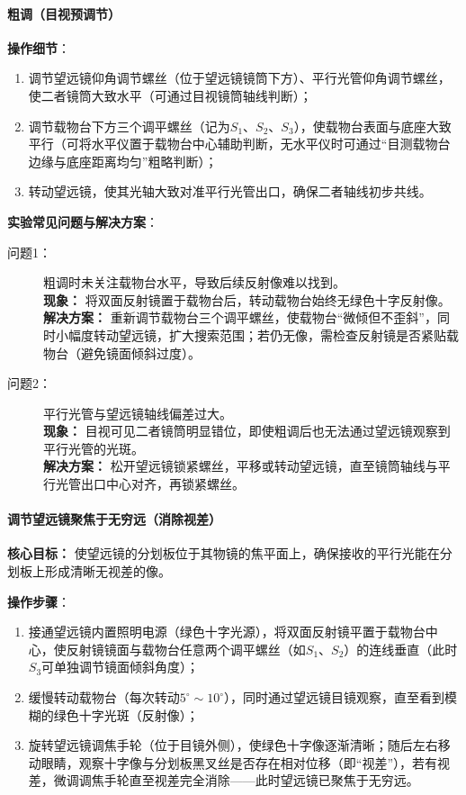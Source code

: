 \documentclass[11pt]{article}
\begin{document}
\paragraph{粗调（目视预调节）}
\textbf{操作细节}：
\begin{enumerate}[label=(\arabic*), itemsep=0.5ex]
    \item 调节望远镜仰角调节螺丝（位于望远镜镜筒下方）、平行光管仰角调节螺丝，使二者镜筒大致水平（可通过目视镜筒轴线判断）；
    \item 调节载物台下方三个调平螺丝（记为$S_1$、$S_2$、$S_3$），使载物台表面与底座大致平行（可将水平仪置于载物台中心辅助判断，无水平仪时可通过“目测载物台边缘与底座距离均匀”粗略判断）；
    \item 转动望远镜，使其光轴大致对准平行光管出口，确保二者轴线初步共线。
\end{enumerate}

\textbf{实验常见问题与解决方案}：
\begin{description}
    \item[问题1：] 粗调时未关注载物台水平，导致后续反射像难以找到。\\
    \textbf{现象：} 将双面反射镜置于载物台后，转动载物台始终无绿色十字反射像。\\
    \textbf{解决方案：} 重新调节载物台三个调平螺丝，使载物台“微倾但不歪斜”，同时小幅度转动望远镜，扩大搜索范围；若仍无像，需检查反射镜是否紧贴载物台（避免镜面倾斜过度）。
    
    \item[问题2：] 平行光管与望远镜轴线偏差过大。\\
    \textbf{现象：} 目视可见二者镜筒明显错位，即使粗调后也无法通过望远镜观察到平行光管的光斑。\\
    \textbf{解决方案：} 松开望远镜锁紧螺丝，平移或转动望远镜，直至镜筒轴线与平行光管出口中心对齐，再锁紧螺丝。
\end{description}

\paragraph{调节望远镜聚焦于无穷远（消除视差）}
\textbf{核心目标：} 使望远镜的分划板位于其物镜的焦平面上，确保接收的平行光能在分划板上形成清晰无视差的像。

\textbf{操作步骤}：
\begin{enumerate}[label=(\arabic*), itemsep=0.5ex]
    \item 接通望远镜内置照明电源（绿色十字光源），将双面反射镜平置于载物台中心，使反射镜镜面与载物台任意两个调平螺丝（如$S_1$、$S_2$）的连线垂直（此时$S_3$可单独调节镜面倾斜角度）；
    \item 缓慢转动载物台（每次转动$5^\circ\sim10^\circ$），同时通过望远镜目镜观察，直至看到模糊的绿色十字光斑（反射像）；
    \item 旋转望远镜调焦手轮（位于目镜外侧），使绿色十字像逐渐清晰；随后左右移动眼睛，观察十字像与分划板黑叉丝是否存在相对位移（即“视差”），若有视差，微调调焦手轮直至视差完全消除——此时望远镜已聚焦于无穷远。
\end{enumerate}
\end{document}
